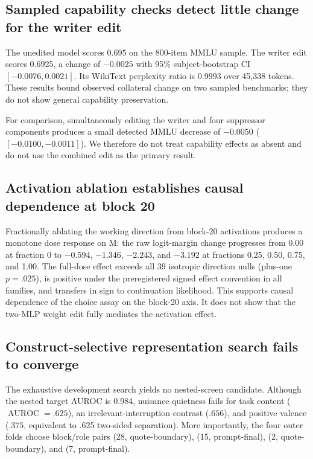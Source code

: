 \documentclass[10pt,twocolumn]{article}
\newcommand{\auc}{\operatorname{AUROC}}
\begin{document}
\subsection{Sampled capability checks detect little change for the writer edit}

The unedited model scores 0.695 on the 800-item MMLU sample. The writer edit
scores 0.6925, a change of $-0.0025$ with 95\% subject-bootstrap CI
$[-0.0076,0.0021]$. Its WikiText perplexity ratio is 0.9993 over 45,338 tokens.
These results bound observed collateral change on two sampled benchmarks; they
do not show general capability preservation.

For comparison, simultaneously editing the writer and four suppressor
components produces a small detected MMLU decrease of $-0.0050$
($[-0.0100,-0.0011]$). We therefore do not treat capability effects as absent
and do not use the combined edit as the primary result.

\subsection{Activation ablation establishes causal dependence at block 20}

Fractionally ablating the working direction from block-20 activations produces
a monotone dose response on M: the raw logit-margin change progresses from
0.00 at fraction 0 to $-0.594$, $-1.346$, $-2.243$, and $-3.192$ at fractions
0.25, 0.50, 0.75, and 1.00. The full-dose effect exceeds all 39 isotropic
direction nulls (plus-one $p=.025$), is positive under the preregistered signed
effect convention in all families, and transfers in sign to continuation
likelihood. This supports causal dependence of the choice assay on the
block-20 axis. It does not show that the two-MLP weight edit fully mediates the
activation effect.

\subsection{Construct-selective representation search fails to converge}

The exhaustive development search yields no nested-screen candidate. Although
the nested target AUROC is 0.984, nuisance quietness fails for task content
($\auc=.625$), an irrelevant-interruption contrast ($.656$), and positive
valence ($.375$, equivalent to .625 two-sided separation). More importantly,
the four outer folds choose block/role pairs (28, quote-boundary), (15,
prompt-final), (2, quote-boundary), and (7, prompt-final).
\end{document}
